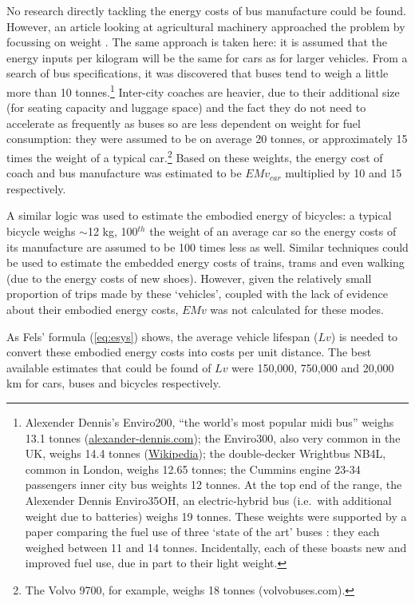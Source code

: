 \documentclass[a4paper, 11pt, twoside]{Thesis}
\begin{document}
No research directly tackling the energy costs of bus manufacture could be found.
However, an article looking at agricultural machinery approached the
problem by focussing on weight \citep{Mikkola201023}. The same approach is
taken here: it is assumed that the energy inputs per kilogram will be the same
for cars as for larger vehicles. From a
search of bus specifications, it was discovered that buses tend to weigh
a little more than 10 tonnes.\footnote{Alexender Dennis's
Enviro200, ``the world's \label{fnbuses}
most popular midi bus'' weighs 13.1 tonnes
(\href{http://www.alexander-dennis.com/uploads/files/e200_spec_sheet.pdf}
{alexander-dennis.com}); the Enviro300, also very common
in the UK, weighs 14.4 tonnes
(\href{https://en.wikipedia.org/wiki/Alexander_Dennis_Enviro300}{Wikipedia});
the double-decker Wrightbus NB4L, common in London, weighs 12.65 tonnes; the
Cummins engine 23-34 passengers inner city bus weights 12 tonnes.
At the top end of the range, the Alexender Dennis  Enviro35OH,
an electric-hybrid bus (i.e.~with additional weight due to batteries)
weighs 19 tonnes.
These weights were supported by a paper comparing the fuel use of three
`state of the art' buses \citep{pelkmans2001emissions}:
they each weighed between 11 and 14 tonnes. Incidentally, each of these
boasts new and improved fuel use, due in part to their light weight.
}
Inter-city coaches are heavier, due to their additional size (for seating capacity
and luggage space) and the fact they do not need to accelerate as
frequently as buses so are less dependent on
weight for fuel consumption: they were assumed to be on average 20
tonnes, or approximately 15 times the weight of a typical
car.\footnote{The Volvo 9700, for example, weighs 18 tonnes
(volvobuses.com).}
Based on these weights, the energy cost of coach and bus manufacture was
estimated to be $EMv_{car}$ multiplied by 10 and 15 respectively.

A similar logic was used to estimate the embodied energy of bicycles:
a typical bicycle weighs $\sim$12 kg, 100$^{th}$ the weight of an average
car so the energy costs of its manufacture are assumed to be 100 times less
as well.
Similar techniques could be used to estimate the embedded energy costs of
trains, trams and even walking (due to the energy costs of new shoes).
However, given the relatively small proportion of trips made by these
`vehicles', coupled with the lack of evidence about their embodied energy
costs, $EMv$ was not calculated for these modes.

As Fels' formula (\cref{eq:esys}) shows, the average vehicle lifespan
($Lv$) is
needed to convert these embodied energy costs into costs per unit distance.
The best available estimates that could be found of 
$Lv$ were 150,000, 750,000 and 20,000 km for cars, buses and bicycles
respectively.
\end{document}
